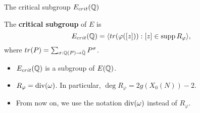 \documentclass[handout]{beamer}
\begin{document}
\begin{frame}{The critical subgroup $E_{crit}(\mathbb{Q})$}
\pause

\begin{Def}
The {\bf critical subgroup} of $E$ is
\[
	E_{crit}(\mathbb{Q})  = \langle tr(\varphi([z])) : [z] \in \operatorname{supp} R_\varphi \rangle, 
\]
where $tr(P) = \sum_{\sigma: \mathbb{Q}(P) \to \bar{\mathbb{Q}}} P^{\sigma}$.
\end{Def}

\pause



\begin{itemize} 
\item $E_{crit}(\mathbb{Q})$ is a subgroup of $E(\mathbb{Q})$.
\item $R_\varphi = \operatorname{div}(\omega)$. In particular, $\deg R_{\varphi} = 2g(X_0(N))-2$. \\
\item From now on, we use the notation $\operatorname{div}(\omega)$ instead of $R_\varphi$.
\end{itemize}


\end{frame}
\end{document}
